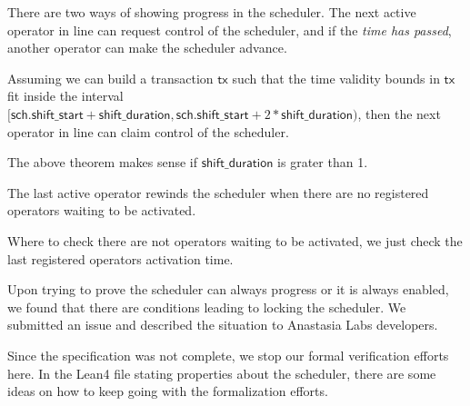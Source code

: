 There are two ways of showing progress in the scheduler.
%
The next active operator in line can request control of the scheduler, and if
the \emph{time has passed}, another operator can make the scheduler advance.

\begin{theorem}
  \leanok
  \label{thm:Scheduler.Properties.ClaimScheduler}
  Assuming we can build a transaction \(\mathsf{tx}\) such that the time
validity bounds in \(\mathsf{tx}\) fit inside the interval
\([ \mathsf{sch.shift\_start} + \mathsf{shift\_duration} , \mathsf{sch.shift\_start} + 2*\mathsf{shift\_duration})\),
then the next operator in line can claim control of the scheduler.
  \end{theorem}

The above theorem makes sense if \(\mathsf{shift\_duration}\) is grater than 1.

\begin{theorem}
  \leanok
  \label{thm:Scheduler.Properties.ClaimSchedulerRewind}
  The last active operator rewinds the scheduler when there are no registered
operators waiting to be activated.
  \end{theorem}

Where to check there are not operators waiting to be activated, we just check
the last registered operators activation time.


Upon trying to prove the scheduler can always progress or it is always enabled,
we found that there are conditions leading to locking the scheduler.
%
We submitted an issue and described the situation to Anastasia Labs developers.

Since the specification was not complete, we stop our formal verification efforts here.
%
In the Lean4 file stating properties about the scheduler, there are some ideas
on how to keep going with the formalization efforts.



